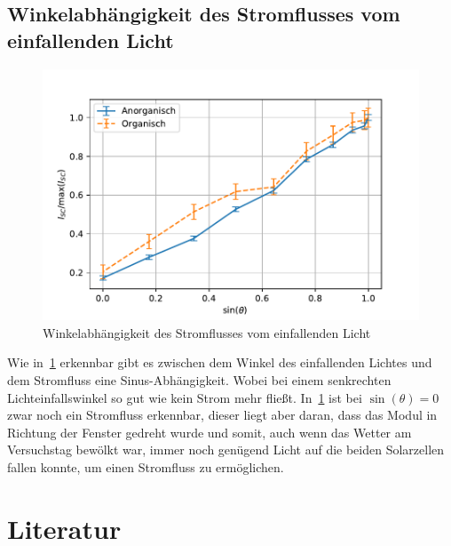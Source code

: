 \documentclass[slug=SZ, room=Hermann-Krone-Bau\,\ Labor\ 1.25, supervisor=Martin\ Kroll]{../../Lab_Report_LaTeX/lab_report}
\begin{document}
\subsection{Winkelabhängigkeit des Stromflusses vom einfallenden Licht}
\label{sec:winkel}

\begin{figure}[H]\centering
	\includegraphics[width=.5\columnwidth]{figs/python/E/relativ.pdf}
	\caption{Winkelabhängigkeit des Stromflusses vom einfallenden Licht}
	\label{fig:winkel}
\end{figure}

Wie in~\ref{fig:winkel} erkennbar gibt es zwischen dem Winkel des einfallenden
Lichtes und dem Stromfluss eine Sinus-Abhängigkeit. Wobei bei einem senkrechten 
Lichteinfallswinkel so gut wie kein Strom mehr fließt.
In~\ref{fig:winkel} ist bei \(\sin(\theta) = 0\) zwar noch ein Stromfluss erkennbar,
dieser liegt aber daran, dass das Modul in Richtung der Fenster gedreht wurde und somit,
auch wenn das Wetter am Versuchstag bewölkt war, immer noch genügend Licht auf die beiden
Solarzellen fallen konnte, um einen Stromfluss zu ermöglichen.

\section{Literatur}
\label{sec:literatur}

\printbibliography
\end{document}
